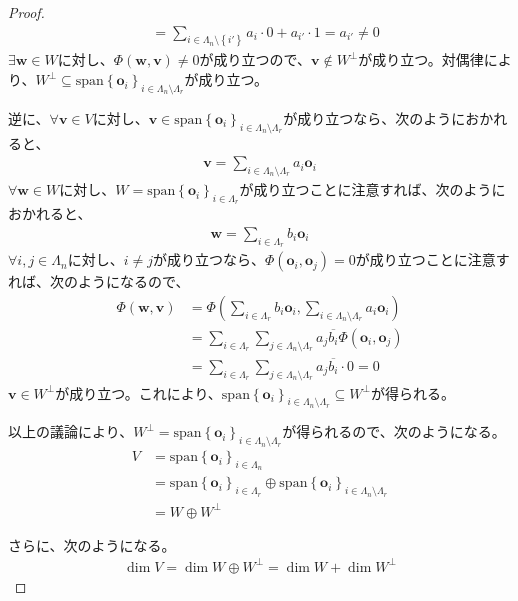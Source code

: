 \documentclass[dvipdfmx]{jsarticle}
\begin{document}
\begin{proof}
\begin{align*}
&= \sum_{i \in \varLambda_{n} \setminus \left\{ i' \right\}} {a_{i} \cdot 0} + a_{i'} \cdot 1 = a_{i'} \neq 0
\end{align*}
$\exists\mathbf{w} \in W$に対し、$\varPhi \left( \mathbf{w},\mathbf{v} \right) \neq 0$が成り立つので、$\mathbf{v} \notin W^{\bot}$が成り立つ。対偶律により、$W^{\bot} \subseteq \mathrm{span}\left\{ \mathbf{o}_{i} \right\}_{i \in \varLambda_{n} \setminus \varLambda_{r}}$が成り立つ。\par
逆に、$\forall\mathbf{v} \in V$に対し、$\mathbf{v} \in \mathrm{span}\left\{ \mathbf{o}_{i} \right\}_{i \in \varLambda_{n} \setminus \varLambda_{r}}$が成り立つなら、次のようにおかれると、
\begin{align*}
\mathbf{v} = \sum_{i \in \varLambda_{n} \setminus \varLambda_{r}} {a_{i}\mathbf{o}_{i}}
\end{align*}
$\forall\mathbf{w} \in W$に対し、$W = \mathrm{span}\left\{ \mathbf{o}_{i} \right\}_{i \in \varLambda_{r}}$が成り立つことに注意すれば、次のようにおかれると、
\begin{align*}
\mathbf{w} = \sum_{i \in \varLambda_{r}} {b_{i}\mathbf{o}_{i}}
\end{align*}
$\forall i,j \in \varLambda_{n}$に対し、$i \neq j$が成り立つなら、$\varPhi \left( \mathbf{o}_{i},\mathbf{o}_{j} \right) = 0$が成り立つことに注意すれば、次のようになるので、
\begin{align*}
\varPhi \left( \mathbf{w},\mathbf{v} \right) &= \varPhi \left( \sum_{i \in \varLambda_{r}} {b_{i}\mathbf{o}_{i}},\sum_{i \in \varLambda_{n} \setminus \varLambda_{r}} {a_{i}\mathbf{o}_{i}} \right)\\
&= \sum_{i \in \varLambda_{r}} {\sum_{j \in \varLambda_{n} \setminus \varLambda_{r}} {a_{j}\overline{b_{i}}\varPhi \left( \mathbf{o}_{i},\mathbf{o}_{j} \right)}}\\
&= \sum_{i \in \varLambda_{r}} {\sum_{j \in \varLambda_{n} \setminus \varLambda_{r}} {a_{j}\overline{b_{i}} \cdot 0}} = 0
\end{align*}
$\mathbf{v} \in W^{\bot}$が成り立つ。これにより、$\mathrm{span}\left\{ \mathbf{o}_{i} \right\}_{i \in \varLambda_{n} \setminus \varLambda_{r}} \subseteq W^{\bot}$が得られる。\par
以上の議論により、$W^{\bot} = \mathrm{span}\left\{ \mathbf{o}_{i} \right\}_{i \in \varLambda_{n} \setminus \varLambda_{r}}$が得られるので、次のようになる。
\begin{align*}
V &= \mathrm{span}\left\{ \mathbf{o}_{i} \right\}_{i \in \varLambda_{n}}\\
&= \mathrm{span}\left\{ \mathbf{o}_{i} \right\}_{i \in \varLambda_{r}} \oplus \mathrm{span}\left\{ \mathbf{o}_{i} \right\}_{i \in \varLambda_{n} \setminus \varLambda_{r}}\\
&= W \oplus W^{\bot}
\end{align*}\par
さらに、次のようになる。
\begin{align*}
\dim V = \dim{W \oplus W^{\bot}} = \dim W + \dim W^{\bot}
\end{align*}
\end{proof}
\end{document}
